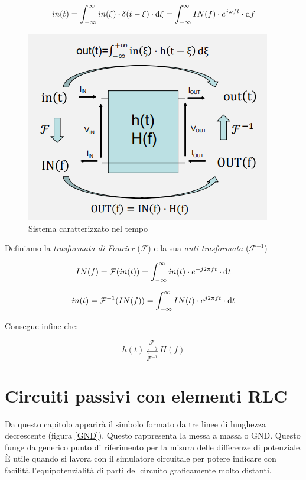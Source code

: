 \documentclass{article}
\begin{document}
\[in(t) = \int_{-\infty}^{\infty} in(\xi) \cdot \delta (t - \xi) \cdot \textrm{d} \xi = \int_{-\infty}^{\infty} IN (f) \cdot e^{j \omega f t} \cdot \textrm d f\]

\begin{figure}[h]
  \centering
  \includegraphics[scale=0.7]{IM_trasformata_fourier}
  \caption{Sistema caratterizzato nel tempo}
  \label{Schema_trasformata_fourier}
\end{figure}

Definiamo la \textit{trasformata di Fourier} ($\mathcal{F}$) e la sua \textit{anti-trasformata} ($\mathcal{F}^{-1}$)

\[IN (f) = \mathcal{F} (in(t)) = \int_{-\infty}^{\infty} in(t) \cdot e^{-j2\pi ft} \cdot \textrm d t\]

\[in (t) = \mathcal{F}^{-1} (IN(f)) = \int_{-\infty}^{\infty} IN(t) \cdot e^{j2\pi ft} \cdot \textrm d t\]

Consegue infine che:

\[h(t) \underset{\mathcal{F}^{-1}}{\overset{\mathcal{F}}{\rightleftarrows}} H(f)\]

\clearpage












\section{Circuiti passivi con elementi RLC}

Da questo capitolo apparirà il simbolo formato da tre linee di lunghezza decrescente (figura \ref{GND}). Questo rappresenta la messa a massa o GND. Questo funge da generico punto di riferimento per la misura delle differenze di potenziale. È utile quando si lavora con il simulatore circuitale per potere indicare con facilità l'equipotenzialità di parti del circuito graficamente molto distanti. 
\end{document}
